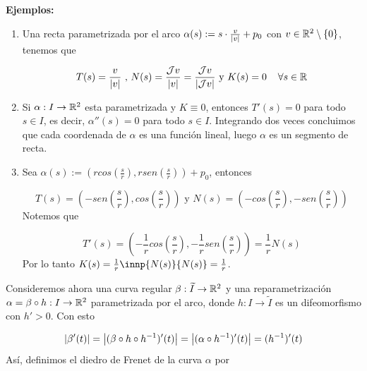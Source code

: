 \documentclass{article}
\begin{document}
\noindent\textbf{Ejemplos:}
\begin{enumerate}
    \item Una recta parametrizada por el arco $\alpha(s):=s\cdot \frac{v}{\left|v \right|}+p_{0}$ con
    $v\in\mathbb{R}^{2}\setminus\{0\}$, tenemos que
    
    \begin{equation*}
        T(s)=\frac{v}{\left|v \right|}\text{ , }N(s)=\frac{\mathcal{J} v}{\left|v \right|}=\frac{\mathcal{J} v}{\left|\mathcal{J} v \right|}
        \text{ y }K(s)=0\hspace{4mm}\forall s\in\mathbb{R}
    \end{equation*}

    \item Si $\alpha: I\to\mathbb{R}^{2}$ esta parametrizada y $K\equiv0$, entonces $T'(s)=0$ para todo
    $s\in I$, es decir, $\alpha''(s)=0$ para todo $s\in I$. Integrando dos veces concluimos que
    cada coordenada de $\alpha$ es una función lineal, luego $\alpha$ es un segmento de recta.

    \item Sea 
    $\alpha(s):=\left(rcos\left(\frac{s}{r}\right),rsen\left(\frac{s}{r}\right)\right)+p_{0}$,
    entonces
    
    \begin{equation*}
        T(s)=\left(-sen\left(\frac{s}{r}\right),cos\left(\frac{s}{r}\right)\right)\text{ y }
        N(s)=\left(-cos\left(\frac{s}{r}\right),-sen\left(\frac{s}{r}\right)\right)
    \end{equation*}
    Notemos que
    
    \begin{equation*}
        T'(s)=\left(-\frac{1}{r}cos\left(\frac{s}{r}\right),-\frac{1}{r}sen\left(
        \frac{s}{r}\right)\right)=\frac{1}{r}N(s)
    \end{equation*}
    Por lo tanto $K(s)=\frac{1}{r}\innp{N(s)}{N(s)}=\frac{1}{r}$.
\end{enumerate}

\noindent Consideremos ahora una curva regular $\beta:\widetilde{I}\to\mathbb{R}^{2}$ y una reparametrización
$\alpha=\beta\circ h: I\to\mathbb{R}^{2}$ parametrizada por el arco, donde $h: I\to\widetilde{I}$ es un
difeomorfismo con $h'>0$. Con esto

\begin{equation*}
    \left|\beta'(t) \right|=\left|(\beta\circ h\circ h^{-1})'(t) \right|=\left|(\alpha\circ h^{-1})'(t) \right|=
    (h^{-1})'(t)
\end{equation*}
Así, definimos el diedro de Frenet de la curva $\alpha$ por
\end{document}

